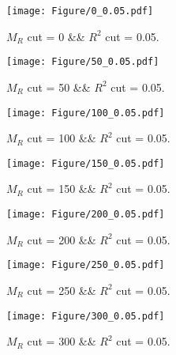  
\begin{figure}[H] 
\begin{center} 
\texttt{[image: Figure/0\_0.05.pdf]} 
\caption{$M_R$ cut = 0 \&\& $R^2$ cut = 0.05.} 
\label{Fig:0_0.05} 
\end{center} 
\end{figure} 
 
 
\begin{figure}[H] 
\begin{center} 
\texttt{[image: Figure/50\_0.05.pdf]} 
\caption{$M_R$ cut = 50 \&\& $R^2$ cut = 0.05.} 
\label{Fig:50_0.05} 
\end{center} 
\end{figure} 
 
 
\begin{figure}[H] 
\begin{center} 
\texttt{[image: Figure/100\_0.05.pdf]} 
\caption{$M_R$ cut = 100 \&\& $R^2$ cut = 0.05.} 
\label{Fig:100_0.05} 
\end{center} 
\end{figure} 
 
 
\begin{figure}[H] 
\begin{center} 
\texttt{[image: Figure/150\_0.05.pdf]} 
\caption{$M_R$ cut = 150 \&\& $R^2$ cut = 0.05.} 
\label{Fig:150_0.05} 
\end{center} 
\end{figure} 
 
 
\begin{figure}[H] 
\begin{center} 
\texttt{[image: Figure/200\_0.05.pdf]} 
\caption{$M_R$ cut = 200 \&\& $R^2$ cut = 0.05.} 
\label{Fig:200_0.05} 
\end{center} 
\end{figure} 
 
 
\begin{figure}[H] 
\begin{center} 
\texttt{[image: Figure/250\_0.05.pdf]} 
\caption{$M_R$ cut = 250 \&\& $R^2$ cut = 0.05.} 
\label{Fig:250_0.05} 
\end{center} 
\end{figure} 
 
 
\begin{figure}[H] 
\begin{center} 
\texttt{[image: Figure/300\_0.05.pdf]} 
\caption{$M_R$ cut = 300 \&\& $R^2$ cut = 0.05.} 
\label{Fig:300_0.05} 
\end{center} 
\end{figure} 
 
